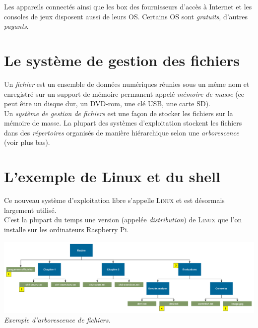 
	Les appareils connectés ainsi que les \og box \fg{} des fournisseurs d'accès à Internet et les consoles de jeux disposent aussi de leurs OS.
	Certains OS sont \textit{gratuits}, d'autres \textit{payants}.
	
	\section{Le système de gestion des fichiers}
	
	Un \textit{fichier} est un ensemble de données numériques réunies sous un même nom et enregistré sur un support de mémoire permanent appelé \textit{mémoire de masse} (ce peut être un disque dur, un DVD-rom, une clé USB, une carte SD).\\
	Un \textit{système de gestion de fichiers} est une façon de stocker les fichiers sur la mémoire de masse. La plupart des systèmes d'exploitation stockent les fichiers dans des \textit{répertoires} organisés de manière hiérarchique selon une \textit{arborescence} (voir plus bas).

	\section{L'exemple de Linux et du shell}

	\medskip\par
	Ce nouveau système d'exploitation libre s'appelle \textsc{Linux} et est désormais largement utilisé.\\
	C'est la plupart du temps une version (appelée \textit{distribution}) de \textsc{Linux} que l'on installe sur les ordinateurs Raspberry Pi.
	
	\begin{center}
		\includegraphics[width=\textwidth]{img/hier.png}\\
		\footnotesize\textit{Exemple d'arborescence de fichiers.}
	\end{center}

